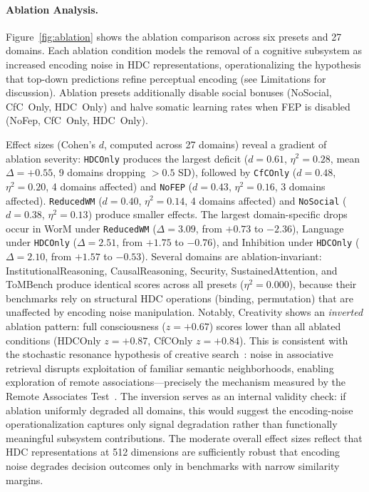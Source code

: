 \documentclass[11pt,letterpaper]{article}
\begin{document}
\paragraph{Ablation Analysis.} Figure~\ref{fig:ablation} shows the ablation comparison across six presets and 27 domains. Each ablation condition models the removal of a cognitive subsystem as increased encoding noise in HDC representations, operationalizing the hypothesis that top-down predictions refine perceptual encoding (see Limitations for discussion). Ablation presets additionally disable social bonuses (NoSocial, CfC~Only, HDC~Only) and halve somatic learning rates when FEP is disabled (NoFep, CfC~Only, HDC~Only).

Effect sizes (Cohen's $d$, computed across 27 domains) reveal a gradient of ablation severity: \texttt{HDCOnly} produces the largest deficit ($d = 0.61$, $\eta^2 = 0.28$, mean $\Delta = +0.55$, 9 domains dropping $> 0.5$ SD), followed by \texttt{CfCOnly} ($d = 0.48$, $\eta^2 = 0.20$, 4 domains affected) and \texttt{NoFEP} ($d = 0.43$, $\eta^2 = 0.16$, 3 domains affected). \texttt{ReducedWM} ($d = 0.40$, $\eta^2 = 0.14$, 4 domains affected) and \texttt{NoSocial} ($d = 0.38$, $\eta^2 = 0.13$) produce smaller effects. The largest domain-specific drops occur in WorM under \texttt{ReducedWM} ($\Delta = 3.09$, from $+0.73$ to $-2.36$), Language under \texttt{HDCOnly} ($\Delta = 2.51$, from $+1.75$ to $-0.76$), and Inhibition under \texttt{HDCOnly} ($\Delta = 2.10$, from $+1.57$ to $-0.53$). Several domains are ablation-invariant: InstitutionalReasoning, CausalReasoning, Security, SustainedAttention, and ToMBench produce identical scores across all presets ($\eta^2 = 0.000$), because their benchmarks rely on structural HDC operations (binding, permutation) that are unaffected by encoding noise manipulation. Notably, Creativity shows an \emph{inverted} ablation pattern: full consciousness ($z = +0.67$) scores lower than all ablated conditions (HDCOnly $z = +0.87$, CfCOnly $z = +0.84$). This is consistent with the stochastic resonance hypothesis of creative search~\citep{martindale1999biological}: noise in associative retrieval disrupts exploitation of familiar semantic neighborhoods, enabling exploration of remote associations---precisely the mechanism measured by the Remote Associates Test~\citep{mednick1962associative}. The inversion serves as an internal validity check: if ablation uniformly degraded all domains, this would suggest the encoding-noise operationalization captures only signal degradation rather than functionally meaningful subsystem contributions. The moderate overall effect sizes reflect that HDC representations at 512 dimensions are sufficiently robust that encoding noise degrades decision outcomes only in benchmarks with narrow similarity margins.
\end{document}
